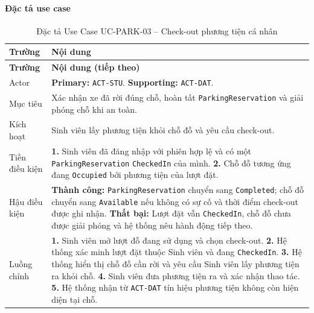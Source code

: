 \paragraph{Đặc tả use case}
\small
\begin{longtable}{|L{26mm}|L{118mm}|}
  \caption{Đặc tả Use Case UC-PARK-03 -- Check-out phương tiện cá nhân}\label{tab:spec-UC-PARK-03}\\
  \hline
  \centering\arraybackslash\textbf{Trường} & \centering\arraybackslash\textbf{Nội dung}\\
  \hline
  \endfirsthead
  \hline
  \centering\arraybackslash\textbf{Trường} & \centering\arraybackslash\textbf{Nội dung (tiếp theo)}\\
  \hline
  \endhead
  Actor & \textbf{Primary:} \texttt{ACT-STU}. \textbf{Supporting:} \texttt{ACT-DAT}.\\\hline
  Mục tiêu & Xác nhận xe đã rời đúng chỗ, hoàn tất \texttt{ParkingReservation} và giải phóng chỗ khi an toàn.\\\hline
  Kích hoạt & Sinh viên lấy phương tiện khỏi chỗ đỗ và yêu cầu check-out.\\\hline
  Tiền điều kiện &
    \textbf{1.} Sinh viên đã đăng nhập với phiên hợp lệ và có một \texttt{ParkingReservation} \texttt{CheckedIn} của mình.\newline
    \textbf{2.} Chỗ đỗ tương ứng đang \texttt{Occupied} bởi phương tiện của lượt đặt.\\\hline
  Hậu điều kiện &
    \textbf{Thành công:} \texttt{ParkingReservation} chuyển sang \texttt{Completed}; chỗ đỗ chuyển sang \texttt{Available} nếu không có sự cố và thời điểm check-out được ghi nhận.\newline
    \textbf{Thất bại:} Lượt đặt vẫn \texttt{CheckedIn}, chỗ đỗ chưa được giải phóng và hệ thống nêu hành động tiếp theo.\\\hline
  Luồng chính &
    \textbf{1.} Sinh viên mở lượt đỗ đang sử dụng và chọn check-out.\newline
    \textbf{2.} Hệ thống xác minh lượt đặt thuộc Sinh viên và đang \texttt{CheckedIn}.\newline
    \textbf{3.} Hệ thống hiển thị chỗ đỗ cần rời và yêu cầu Sinh viên lấy phương tiện ra khỏi chỗ.\newline
    \textbf{4.} Sinh viên đưa phương tiện ra và xác nhận thao tác.\newline
    \textbf{5.} Hệ thống nhận từ \texttt{ACT-DAT} tín hiệu phương tiện không còn hiện diện tại chỗ.\newline

\end{longtable}
